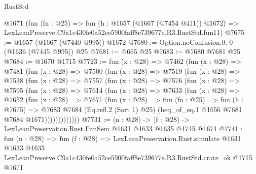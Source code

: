 \begin{lexlean}{RustStd}
\begin{coremodule}
    @1671
    (fun (fn : @25) =>
    fun (h : @1657 (@1667 (@7454 @411)) @1672) =>
    LexLeanPreserve.C9a1c430fe0a52ce5900faff8e739677e.R3.RustStd.fun11)
@7675 := @1657 (@1667 (@7440 @995)) @1672
@7680 := Option.noConfusion.{0, 0} (@1636 (@7445 @995)) @25
@7681 := @665 @25
@7683 := @7680 @7681 @25
@7684 := @1670 @1715
@7723 := fun (x : @28) =>
  @7462
    (fun (x : @28) =>
    @7481
      (fun (x : @28) =>
      @7500
        (fun (x : @28) =>
        @7519
          (fun (x : @28) =>
          @7538
            (fun (x : @28) =>
            @7557
              (fun (x : @28) =>
              @7576
                (fun (x : @28) =>
                @7595
                  (fun (x : @28) =>
                  @7614
                    (fun (x : @28) =>
                    @7633
                      (fun (x : @28) =>
                      @7652
                        (fun (x : @28) =>
                        @7671
                          (fun (x : @28) =>
                          fun (fn : @25) =>
                          fun (h : @7675) =>
                          @7683
                            @7684
                            (Eq.refl.{2} (Sort 1) @25)
                            (heq_of_eq.{1} @1656 @7681 @7684 @1671)))))))))))))
@7731 := (n : @28) -> (f : @28) -> LexLeanPreservation.Rust.FunSem @1631 @1633 @1635 @1715 @1671
@7741 := fun (n : @28) =>
  fun (f : @28) =>
  LexLeanPreservation.Rust.simulate
    @1631
    @1633
    @1635
    LexLeanPreserve.C9a1c430fe0a52ce5900faff8e739677e.R3.RustStd.crate_ok
    @1715
    @1671
\end{coremodule}
\end{lexlean}
